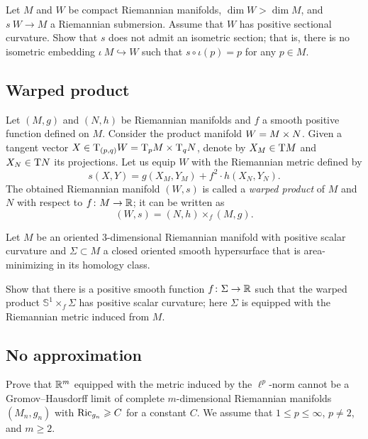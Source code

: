 \begin{pr}
Let $M$ and $W$ be compact Riemannian manifolds,
$\dim W>\dim M$,
and $s\:W\to M$ a Riemannian submersion.
Assume that $W$ has positive sectional curvature.
Show that $s$ does not admit an isometric section;
that is, there is no isometric embedding $\iota\:M\hookrightarrow W$ such that $s\circ\iota(p)=p$ for any $p\in M$.
\end{pr}

\subsection*{Warped product}
\label{Warped product}
\label{page:warped product}

Let $(M,g)$ and $(N,h)$ be Riemannian manifolds 
and $f$ a smooth positive function defined on $M$.
Consider the product manifold $W\z=M\times N$.
Given a tangent vector 
$X\z\in \T_{(p,q)} W
\z=\T_p M\times \T_q N$, denote by
$X_M\z\in \T M$ and $X_N\z\in \T N$ its projections.
Let us equip $W$ with the Riemannian metric defined by
\[s(X,Y)=g(X_M,Y_M)+f^2\cdot h(X_N,Y_N).\]
The obtained Riemannian manifold $(W,s)$ is called a \emph{warped product} of $M$ and $N$ with respect to $f\colon M\to \mathbb{R}$;
it can be written as  
\[(W,s)=(N,h)\times_f(M,g).\]

\begin{pr}
Let $M$ be an oriented 3-dimensional Riemannian manifold with positive scalar curvature 
and $\Sigma\subset M$ a closed oriented smooth hypersurface that is area-minimizing in its homology class.

Show that there is a positive smooth function $f\colon\Sigma\to \mathbb{R}$
such that the warped product $\mathbb S^1\times_f \Sigma$
has positive scalar curvature;
here $\Sigma$ is equipped with the Riemannian metric
induced from $M$.
\end{pr}

\subsection*{No approximation\many}
\label{No approximation}

\begin{pr}
Prove that 
$\mathbb{R}^m$
equipped with the metric induced by the $\ell^p$-norm 
cannot be a
Gromov--Hausdorff limit of
complete $m$-dimensional Riemannian manifolds $(M_n,g_n)$ with $\Ric_{g_n}\z\ge C$ for a constant $C$.
We assume that $1\le p\le \infty$, $p\not=2$, and $m\ge 2$.
\end{pr}


